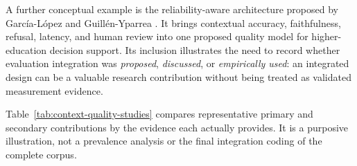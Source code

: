 A further conceptual example is the reliability-aware architecture proposed by García-López and Guillén-Yparrea \cite{garcialopez2026reliabilityrag}. It brings contextual accuracy, faithfulness, refusal, latency, and human review into one proposed quality model for higher-education decision support. Its inclusion illustrates the need to record whether evaluation integration was \emph{proposed}, \emph{discussed}, or \emph{empirically used}: an integrated design can be a valuable research contribution without being treated as validated measurement evidence.

Table~\ref{tab:context-quality-studies} compares representative primary and secondary contributions by the evidence each actually provides. It is a purposive illustration, not a prevalence analysis or the final integration coding of the complete corpus.

